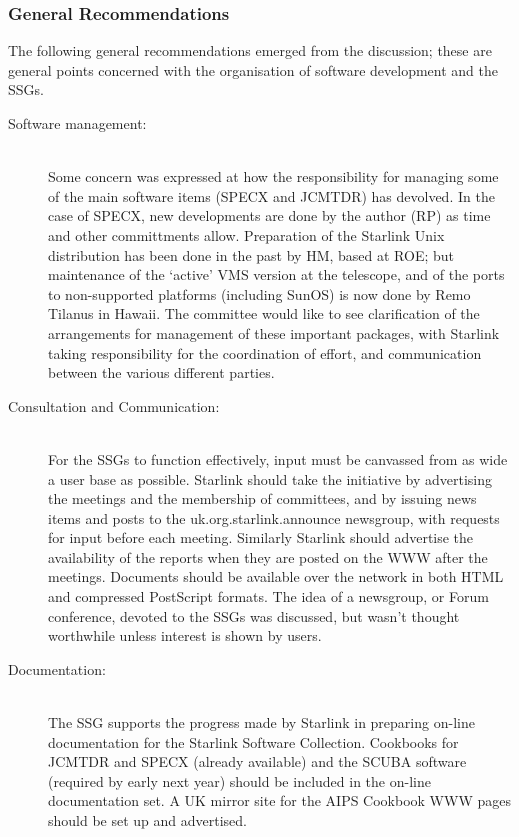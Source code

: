 \subsubsection{General Recommendations}

The following general recommendations emerged from the discussion;
these are general points concerned with the organisation of software
development and the SSGs.

\begin{description}
\item[Software management:]\mbox{}\\
Some concern was expressed at how the responsibility for managing some
of the main software items (SPECX and JCMTDR) has devolved.  In the
case of SPECX, new developments are done by the author (RP) as time
and other committments allow.  Preparation of the Starlink Unix
distribution has been done in the past by HM, based at ROE; but
maintenance of the `active' VMS version at the telescope, and of the
ports to non-supported platforms (including SunOS) is now done by Remo
Tilanus in Hawaii.  The committee would like to see clarification of
the arrangements for management of these important packages, with
Starlink taking responsibility for the coordination of effort, and
communication between the various different parties.

\item[Consultation and Communication:]\mbox{}\\
For the SSGs to function effectively, input must be canvassed from as
wide a user base as possible. Starlink should take the initiative by
advertising the meetings and the membership of committees, and by
issuing news items and posts to the uk.org.starlink.announce
newsgroup, with requests for input before each meeting. Similarly
Starlink should advertise the availability of the reports when they
are posted on the WWW after the meetings. Documents should be
available over the network in both HTML and compressed PostScript
formats. The idea of a newsgroup, or Forum conference, devoted to the
SSGs was discussed, but wasn't thought worthwhile unless interest is
shown by users.

\item[Documentation:]\mbox{}\\
The SSG supports the progress made by Starlink in preparing on-line
documentation for the Starlink Software Collection.  Cookbooks for
JCMTDR and SPECX (already available) and the SCUBA software (required
by early next year) should be included in the on-line documentation
set.  A UK mirror site for the AIPS Cookbook WWW pages should be set
up and advertised.


\end{description}

